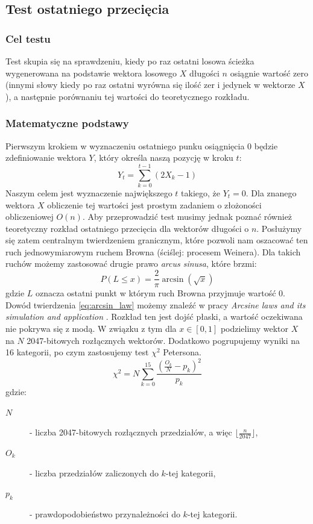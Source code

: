 \subsection{Test ostatniego przecięcia}
\subsubsection{Cel testu}
Test skupia się na sprawdzeniu, kiedy po raz ostatni losowa ścieżka wygenerowana na podstawie wektora losowego $X$ długości $n$ osiągnie wartość zero (innymi słowy kiedy po raz ostatni wyrówna się ilość zer i jedynek w wektorze $X$), a następnie porównaniu tej wartości do teoretycznego rozkładu. 
\subsubsection{Matematyczne podstawy}
Pierwszym krokiem w wyznaczeniu ostatniego punku osiągnięcia 0 będzie zdefiniowanie wektora $Y$, który określa naszą pozycję w kroku $t$:
\begin{equation}
    Y_t = \sum_{k=0}^{t-1}(2X_k-1)
\end{equation}
Naszym celem jest wyznaczenie największego $t$ takiego, że $Y_t = 0$. Dla znanego wektora $X$ obliczenie tej wartości jest prostym zadaniem o złożoności obliczeniowej $O(n)$. Aby przeprowadzić test musimy jednak poznać również teoretyczny rozkład ostatniego przecięcia dla wektorów długości o $n$. Posłużymy się zatem centralnym twierdzeniem granicznym, które pozwoli nam oszacować ten ruch jednowymiarowym ruchem Browna (ściślej: procesem Weinera). Dla takich ruchów możemy zastosować drugie prawo \emph{arcus sinusa}, które brzmi:
\begin{equation}
    \label{eq:arcsin_law}
    P(L \leq x) = \frac{2}{\pi}\arcsin(\sqrt{x})
\end{equation}
gdzie $L$ oznacza ostatni punkt w którym ruch Browna przyjmuje wartość 0. Dowód twierdzenia \ref{eq:arcsin_law} możemy znaleźć w pracy \emph{Arcsine laws and its simulation and application} \cite{arcsin_laws}. Rozkład ten jest dojść płaski, a wartość oczekiwana nie pokrywa się z modą. W związku z tym dla $x \in [0, 1]$ podzielimy wektor $X$ na $N$ 2047-bitowych rozłącznych wektorów. Dodatkowo pogrupujemy wyniki na 16 kategorii, po czym zastosujemy test $\chi^2$ Petersona.
\begin{equation}
    \chi^2 = N\sum_{k=0}^{15}{\frac{(\frac{O_k}{N}-p_k)^2}{p_k}}
\end{equation}
gdzie:
\begin{description}
    \item[$N$] - liczba 2047-bitowych rozłącznych przedziałów, a więc $\lfloor \frac{n}{2047} \rfloor$,
    \item[$O_k$] - liczba przedziałów zaliczonych do $k$-tej kategorii, 
    \item[$p_k$] - prawdopodobieństwo przynależności do $k$-tej kategorii.
\end{description}
